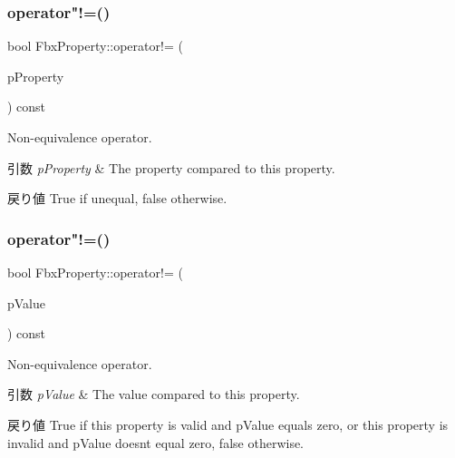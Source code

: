 \mbox{\label{class_fbx_property_a78e06f51d52af04ffef695e3dd795659}} 
\subsubsection{\texorpdfstring{operator"!=()}{operator!=()}\hspace{0.1cm}{\footnotesize\ttfamily [1/2]}}
{\footnotesize\ttfamily bool Fbx\+Property\+::operator!= (\begin{DoxyParamCaption}\item[{const \hyperlink{class_fbx_property}{Fbx\+Property} \&}]{p\+Property }\end{DoxyParamCaption}) const}

Non-\/equivalence operator. 
\begin{DoxyParams}{引数}
{\em p\+Property} & The property compared to this property. \\
\hline
\end{DoxyParams}
\begin{DoxyReturn}{戻り値}
{\ttfamily True} if unequal, {\ttfamily false} otherwise. 
\end{DoxyReturn}
\mbox{\label{class_fbx_property_a9cb24dd197f19e6d1cc8dad2b757dce0}} 
\subsubsection{\texorpdfstring{operator"!=()}{operator!=()}\hspace{0.1cm}{\footnotesize\ttfamily [2/2]}}
{\footnotesize\ttfamily bool Fbx\+Property\+::operator!= (\begin{DoxyParamCaption}\item[{int}]{p\+Value }\end{DoxyParamCaption}) const\hspace{0.3cm}{\ttfamily [inline]}}

Non-\/equivalence operator. 
\begin{DoxyParams}{引数}
{\em p\+Value} & The value compared to this property. \\
\hline
\end{DoxyParams}
\begin{DoxyReturn}{戻り値}
{\ttfamily True} if this property is valid and p\+Value equals zero, or this property is invalid and p\+Value doesn\textquotesingle{}t equal zero, {\ttfamily false} otherwise. 
\end{DoxyReturn}


